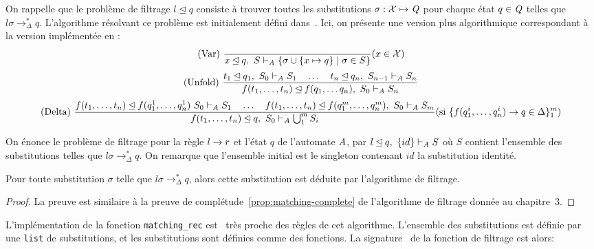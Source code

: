 On rappelle que le problème de filtrage $l \unlhd q$ consiste à trouver toutes les substitutions
$\sigma:\mathcal X \mapsto \mathit Q$ pour chaque état $q \in \mathit Q$ telles que 
$l\sigma \rightarrow_\Delta^* q$. L'algorithme résolvant ce problème est initialement 
défini dans~\cite{Genet-RR97b}. Ici, on présente une version plus algorithmique correspondant 
à la version implémentée en \coq:
{\footnotesize
  \[\textrm{(Var) }
  \dfrac{}{x \unlhd q,\ S \vdash_\mathit A \{\sigma \cup \{x \mapsto q\} \; | \; \sigma \in S \}}
  (x \in \mathcal X)
  \]
  \[\textrm{(Unfold) }
  \dfrac{
    t_1 \unlhd q_1, \ S_0 \vdash_\mathit A S_1
    \quad \dots \quad
    t_n \unlhd q_n, \ S_{n-1} \vdash_\mathit A S_n
  }{f(t_1, \dots, t_n) \unlhd f(q_1, \dots q_n),\ S_0 \vdash_\mathit A S_n}
  \]
  \hspace*{-1cm}
  \[
  \textrm{(Delta) }
   \dfrac{
     f(t_1, \dots, t_n) \unlhd f(q_1^1, \dots, q_n^1)\ S_0 \vdash_\mathit A S_1
     \quad \dots \quad
     f(t_1 ,\dots, t_n) \unlhd f(q_1^m, \dots, q_n^m),\ S_0 \vdash_\mathit A S_m
   }{
     f(t_1, \dots, t_n) \unlhd q,\ S_0 \vdash_\mathit A \bigcup_1^m S_i
   }
   (
   \textrm{si } \{ f(q_1^i, \dots, q_n^i) \rightarrow q \in \Delta\} _1^m 
   )
   \]
 }

On énonce le problème de filtrage pour la règle $l \rightarrow r$ et l'état $q$ de l'automate $\mathit A$,
par $l\unlhd q,\ \{id\} \vdash_\mathit A S$ où $S$ contient l'ensemble des substitutions telles que
$l\sigma \rightarrow_\Delta^* q$. On remarque que l'ensemble initial est le singleton contenant $id$
la substitution identité.

\begin{theorem}
  \label{th:completeness}
  Pour toute substitution $\sigma$ telle que $l\sigma \rightarrow_\Delta^* q$, alors 
  cette substitution est déduite par l'algorithme de filtrage.
\end{theorem}

\begin{proof}
  La preuve est similaire à la preuve de complétude~\ref{prop:matching-complete} de l'algorithme de filtrage
  donnée au chapitre~3.
\end{proof}

L'implémentation de la fonction \lstinline!matching_rec! est \coq\ très proche
des règles de cet algorithme. L'ensemble des substitutions est définie par une 
\lstinline!list! de substitutions, et les substitutions sont définies comme des fonctions.
La signature \coq\ de la fonction de filtrage est alors:

